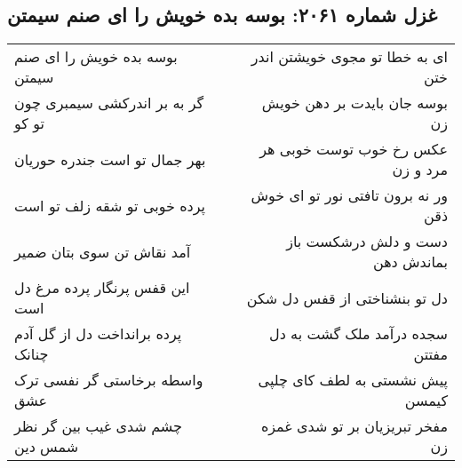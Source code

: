 \begin{center}
\section*{غزل شماره ۲۰۶۱: بوسه بده خویش را ای صنم سیمتن}
\label{sec:2061}
\begin{longtable}{l p{0.5cm} r}
بوسه بده خویش را ای صنم سیمتن
&&
ای به خطا تو مجوی خویشتن اندر ختن
\\
گر به بر اندرکشی سیمبری چون تو کو
&&
بوسه جان بایدت بر دهن خویش زن
\\
بهر جمال تو است جندره حوریان
&&
عکس رخ خوب توست خوبی هر مرد و زن
\\
پرده خوبی تو شقه زلف تو است
&&
ور نه برون تافتی نور تو ای خوش ذقن
\\
آمد نقاش تن سوی بتان ضمیر
&&
دست و دلش درشکست باز بماندش دهن
\\
این قفس پرنگار پرده مرغ دل است
&&
دل تو بنشناختی از قفس دل شکن
\\
پرده برانداخت دل از گل آدم چنانک
&&
سجده درآمد ملک گشت به دل مفتتن
\\
واسطه برخاستی گر نفسی ترک عشق
&&
پیش نشستی به لطف کای چلپی کیمسن
\\
چشم شدی غیب بین گر نظر شمس دین
&&
مفخر تبریزیان بر تو شدی غمزه زن
\\
\end{longtable}
\end{center}
